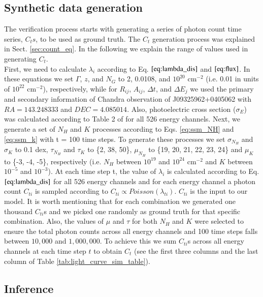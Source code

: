 \documentclass{aa}
\begin{document}
\subsection{Synthetic data generation}
\label{sec:synthetic_data}
The verification process starts with generating a series of photon count time series, $C_ts$, to be used as ground truth. The $C_t$ generation process was explained in Sect. \ref{sec:count_eq}. In the following we explain the range of values used in generating $C_t$. \\
First, we need to calculate $\lambda_i$ according to Eq. $\ref{eq:lambda_dis}$ and $\ref{eq:flux}$. In these equations we set $\Gamma$, $z$, and $N_G$ to 2, 0.0108, and
$10^{20}$ cm$^{-2}$ (i.e. 0.01 in units of $10^{22}$ cm$^{-2}$), respectively, while for $R_{ij}$, $A_{ij}$, $\Delta t$, and $\Delta E_j$ we used the primary and secondary information of Chandra observation of J09325962+0405062 with $RA = 143.248333$ and $DEC = 4.085014$. Also, photoelectric cross section ($\sigma_E$) was calculated according to Table 2 of \citet{Morrison1983} for all 526 energy channels. Next, we generate a set of $N_H$ and $K$ processes according to Eqs. \ref{eq:ssm_NH} and \ref{eq:ssm_k} with t = 100 time steps. To generate these processes we set $\sigma_{N_H}$ and $\sigma_K$ to 0.1 dex, $\tau_{N_H}$ and $\tau_K$ to \{2, 38, 50\}, $\mu_{N_H}$ to \{19, 20, 21, 22, 23, 24\} and $\mu_K$ to \{-3, -4, -5\}, respectively (i.e. $N_H$ between $10^{19}$ and $10^{24}$ cm$^{-2}$ and $K$ between $10^{-5}$ and $10^{-3}$). At each time step t, the value of $\lambda_i$ is calculated according to Eq. $\ref{eq:lambda_dis}$ for all 526 energy channels and for each energy channel a photon count $C_{ti}$ is sampled according to $C_{ti} \propto Poisson(\lambda_{ti})$. $C_{ti}$ is the input to our model. It is worth mentioning that for each combination we generated one thousand $C_{ti}$s and we picked one randomly as ground truth for that specific combination. Also, the values of $\mu$ and $\tau$ for both $N_H$ and $K$ were selected to ensure the total photon counts across all energy channels and 100 time steps falls between $10,000$ and $1,000,000$. To achieve this we sum $C_{ti}$s across all energy channels at each time step $t$ to obtain $C_t$ (see the first three columns and the last column of Table \ref{tab:light_curve_sim_table}). \\ 

\subsection{Inference}
\label{sec:inference}
\end{document}
